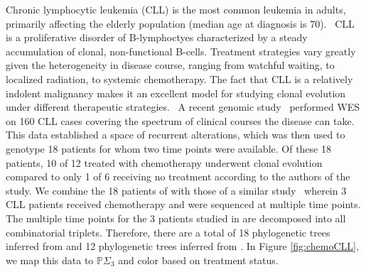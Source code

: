 \documentclass[a4paper,11pt]{article}
\begin{document}
Chronic lymphocytic leukemia (CLL) is the most common leukemia in adults, primarily affecting the elderly population (median age at diagnosis is 70).~\cite{smith2011incidence}
CLL is a proliferative disorder of B-lymphoctyes characterized by a steady accumulation of clonal, non-functional B-cells.
Treatment strategies vary greatly given the heterogeneity in disease course, ranging from watchful waiting, to localized radiation, to systemic chemotherapy.
The fact that CLL is a relatively indolent malignancy makes it an excellent model for studying clonal evolution under different therapeutic strategies.~\cite{wang2015tumor}  
A recent genomic study~\cite{landau2013evolution} performed WES on 160 CLL cases covering the spectrum of clinical courses the disease can take.
This data established a space of recurrent alterations, which was then used to genotype 18 patients for whom two time points were available.
Of these 18 patients, 10 of 12 treated with chemotherapy underwent clonal evolution compared to only 1 of 6 receiving no treatment according to the authors of the study.
We combine the 18 patients of \cite{landau2013evolution} with those of a similar study~\cite{schuh2012monitoring} wherein 3 CLL patients received chemotherapy and were sequenced at multiple time points.
The multiple time points for the 3 patients studied in \cite{schuh2012monitoring} are decomposed into all combinatorial triplets.
Therefore, there are a total of 18 phylogenetic trees inferred from \cite{landau2013evolution} and 12 phylogenetic trees inferred from \cite{schuh2012monitoring}.
In Figure \ref{fig:chemoCLL}, we map this data to $\mathbb{P}\Sigma_3$ and color based on treatment status.
\end{document}
